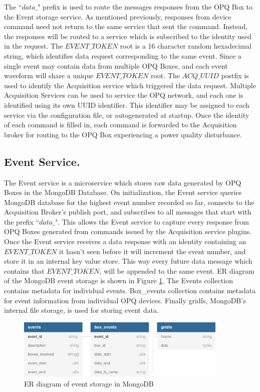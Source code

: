 The ``$data\_$" prefix is used to route the messages responses from the OPQ Box to the Event storage service.
As mentioned previously, responses from device command need not return to the same service that sent the command.
Instead, the responses will be routed to a service which is subscribed to the identity used in the request.
The $EVENT\_TOKEN$ root is a 16 character random hexadecimal string, which identifies data request corresponding to the same event.
Since a single event may contain data from multiple OPQ Boxes, and each event waveform will share a unique $EVENT\_TOKEN$ root.
The $ACQ\_UUID$ postfix is used to identify the Acquisition service which triggered the data request.
Multiple Acquisition Services can be used to service the OPQ network, and each one is identified using its own UUID identifier.
This identifier may be assigned to each service via the configuration file, or autogenerated at startup.
Once the identity of each command is filled in, each command is forwarded to the Acquisition broker for routing to the OPQ Box experiencing a power quality disturbance.

\subsection{Event Service.}\label{subsec:event-service}

The Event service is a microservice which stores raw data generated by OPQ Boxes in the MongoDB Database.
On initialization, the Event service queries MongoDB database for the highest event number recorded so far, connects to the Acquisition Broker's publish port,
and subscribes to all messages that start with the prefix ``$data\_$".
This allows the Event service to capture every response from OPQ Boxes generated from commands issued by the Acquisition service plugins.
Once the Event service receives a data response with an identity containing an $EVENT\_TOKEN$ it hasn't seen before it will increment the event number, and
store it in an internal key value store.
This way every future data message which contains that $EVENT\_TOKEN$, will be appended to the same event.
ER diagram of the MongoDB event storage is shown in Figure \ref{fig:opq:mongo_er}.
The Events collection contains metadata for individual events.
Box\_events collection contains metadata for event information from individual OPQ devices.
Finally gridfs, MongoDB's internal file storage, is used for storing event data.

\begin{figure}[h]
	\begin{center}
		\includegraphics[width=0.9\textwidth]{img/mongo_event_storage.pdf}
	\end{center}
	\caption{ER diagram of event storage in MongoDB}
	\label{fig:opq:mongo_er}
\end{figure}

